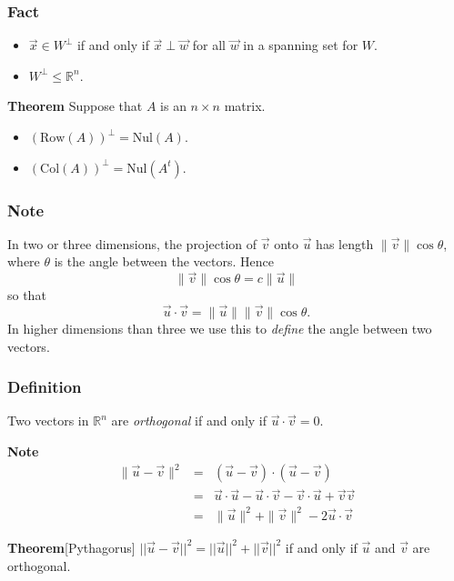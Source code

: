 \begin{frame}[fragile] \frametitle{Fact}
\begin{itemize}
  \item $\vec{x}\in W^{\perp}$ if and only if $\vec{x}\perp \vec{w}$ for all $\vec{w}$ in a spanning set for $W$.
  \item  $W^{\perp}\le \mathbb R^n$.
\end{itemize}
  

\textbf{Theorem}
 Suppose that $A$ is an $n\times n$ matrix.
\begin{itemize}
  \item $(\mbox{Row}(A))^{\perp} = \mbox{Nul}(A)$.
  \item $(\mbox{Col}(A))^{\perp}=\mbox{Nul}(A^t)$.
\end{itemize}

\end{frame}


\begin{frame}[fragile] \frametitle{Note}
 In two or three dimensions, the projection of $\vec{v}$ onto $\vec{u}$
has length $\| \vec{v} \| \cos \theta$, where $\theta$ is the angle between
the vectors.  Hence
\[
 \| \vec{v} \| \cos \theta = c \| \vec{u} \|
\]
so that 
\[
 \vec{u}\cdot\vec{v} = \| \vec{u} \| \| \vec{v} \| \cos \theta.
\]
In higher dimensions than three we use this to {\em define} the angle between two vectors.

\end{frame}

\begin{frame}[fragile] \frametitle{Definition}
 Two vectors in $\mathbb R^n$ are {\em orthogonal} if and only if $\vec{u}\cdot\vec{v}=0$.
  

\textbf{Note}
\begin{eqnarray*}
 \| \vec{u} -\vec{v}\|^2 & =  & (\vec{u}-\vec{v})\cdot(\vec{u}- \vec{v})\\
& = & \vec{u}\cdot \vec{u} - \vec{u} \cdot \vec{v} 
      - \vec{v} \cdot \vec{u} + \vec{v}\vec{v} \\
& = & \| \vec{u} \|^2 + \| \vec{v}\|^2 - 2 \vec{u}\cdot\vec{v}
\end{eqnarray*}
 

\textbf{Theorem}[Pythagorus]
 $||\vec{u} - \vec{v}||^2 = ||\vec{u}||^2 + ||\vec{v}||^2$ if and only if $\vec{u}$ and $\vec{v}$ are orthogonal.


\end{frame}



